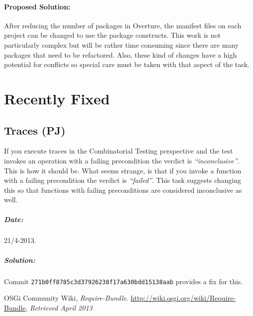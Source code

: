 \documentclass[11pt]{overturerep} \usepackage{t1enc,times,a4,t1enc}
\begin{document}
    \subsubsection{Proposed Solution:} After reducing the number of packages in
    Overture, the manifest files on each project can be changed to use the
    package constructs. This work is not particularly complex but will be
    rather time consuming since there are many packages that need to be
    refactored. Also, these kind of changes have a high potential for conflicts
    so special care must be taken with that aspect of the task.




\chapter{Recently Fixed}

\section{Traces (PJ)}

If you execute traces in the Combinatorial Testing perspective and the test invokes an operation with a failing precondition the verdict is \textit{``inconclusive''}. This is how it should be. What seems strange, is that if you invoke a function with a failing precondition the verdict is \textit{``failed''}. This task suggests changing this so that functions with failing preconditions are considered inconclusive as well.

\paragraph{Date:}
21/4-2013.

\paragraph{Solution:}
Commit \texttt{271b0ff8785c3d37926238f17a630bdd15138aab} provides a fix for this.



    \begin{thebibliography}{9}

 OSGi Community Wiki, \emph{Require-Bundle}.
    \url{http://wiki.osgi.org/wiki/Require-Bundle}, \emph{Retrieved April 2013}

\end{thebibliography} 
\end{document}
